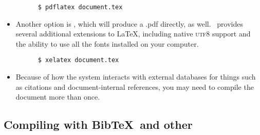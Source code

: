 \documentclass[11pt, letterpaper]{article}
\begin{document}
\begin{itemize}
	\begin{verbatim}
	  $ pdflatex document.tex
	\end{verbatim}
	
      \item Another option is \XeLaTeX, which will produce a .pdf directly, as well. \XeLaTeX\ provides several additional extensions to \LaTeX, including native \textsc{utf8} support and the ability to use all the fonts installed on your computer.
      
	\begin{verbatim}
	  $ xelatex document.tex
	\end{verbatim}
	

      \item Because of how the system interacts with external databases for things such as citations and document-internal references, you may need to compile the document more than once.
      
%       
    \end{itemize}
    
  \subsection{Compiling with Bib\TeX\ and other}
  
\end{document}
